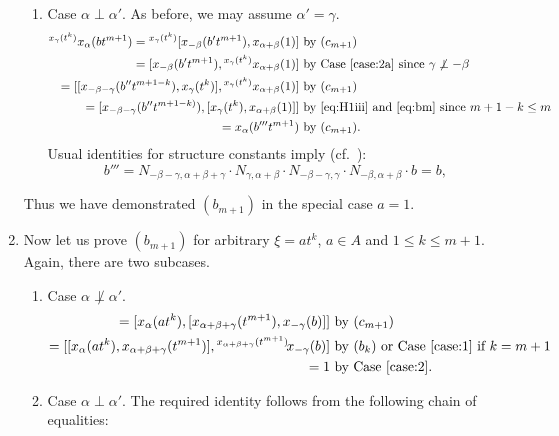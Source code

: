 \documentclass[oneside, 10pt]{amsart}
\numberwithin{equation}{section}
\numberwithin{lemma}{section}
\theoremstyle{definition}
\theoremstyle{remark}
\begin{document}
\begin{enumerate}
\begin{enumerate}
 \item Case $\alpha\perp\alpha'$. As before, we may assume $\alpha'=\gamma$.
\begin{align*}
{}^{x_\gamma(t^k)}x_\alpha(bt^{m+1}) = {}^{x_\gamma(t^k)}[x_{-\beta}(b't^{m+1}), x_{\alpha+\beta}(1)] & \text{ by $(c_{m+1})$}\\
 = [x_{-\beta}(b't^{m+1}), {}^{x_\gamma(t^k)}x_{\alpha+\beta}(1)]                                     & \text{ by Case~\eqref{case:2a} since $\gamma\not\perp-\beta$}\\
 = [[x_{-\beta-\gamma}(b''t^{m+1-k}), x_\gamma(t^k)], {}^{x_\gamma(t^k)}x_{\alpha+\beta}(1)]          & \text{ by $(c_{m+1})$}\\
 = [x_{-\beta-\gamma}(b''t^{m+1-k)}), [x_\gamma(t^k), x_{\alpha+\beta}(1)]]                           & \text{ by~\eqref{eq:H1iii} and~\eqref{eq:bm} since $m+1-k \leq m$}\\
 = x_{\alpha}(b'''t^{m+1})                                                                            & \text{ by $(c_{m+1})$.} \end{align*}
 Usual identities for structure constants imply (cf.~\cite[p.~12]{Re75}):
 \[b'''=N_{-\beta-\gamma, \alpha+\beta+\gamma} \cdot N_{\gamma, \alpha+\beta} \cdot N_{-\beta-\gamma, \gamma} \cdot N_{-\beta, \alpha+\beta} \cdot b = b, \] 
\end{enumerate}
Thus we have demonstrated $(b_{m+1})$ in the special case $a=1$.
\item Now let us prove $(b_{m+1})$ for arbitrary $\xi = at^k$, $a\in A$ and $1\leq k\leq m+1$. Again, there are two subcases.
\begin{enumerate}
\item \label{case:3a} Case $\alpha \not\perp \alpha'$. %
 \begin{align*} [x_\alpha(at^k), x_{\alpha + \beta}(bt^{m+1})] = [x_\alpha(at^k), [x_{\alpha+\beta+\gamma}(t^{m+1}), x_{-\gamma}(b)]] & \text{ by $(c_{m+1})$} \\
  = [[x_\alpha(at^k), x_{\alpha+\beta+\gamma}(t^{m+1})], {}^{x_{\alpha+\beta+\gamma}(t^{m+1})}\!x_{-\gamma}(b)] & \text{ by $(b_k)$ or Case~\eqref{case:1} if $k=m+1$} \\
  = 1 & \text{ by Case~\eqref{case:2}.} \end{align*}
\item Case $\alpha \perp \alpha'$.
The required identity follows from the following chain of equalities:

\end{enumerate}
\end{enumerate}
\end{document}
